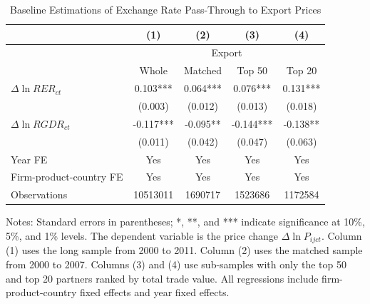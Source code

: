 \documentclass[12pt]{article}
\begin{document}
\begin{table}[htbp]
	\centering
	\caption{Baseline Estimations of Exchange Rate Pass-Through to Export Prices}
	\begin{threeparttable}
		\begin{tabular}{lcccc}
			\toprule
			& (1)   & (2)   & (3)   & (4) \\
			\midrule
			& \multicolumn{4}{c}{Export} \\
			& Whole & Matched & Top 50 & Top 20 \\
			\midrule
			$\Delta \ln RER_{ct}$ & 0.103*** & 0.064*** & 0.076*** & 0.131*** \\
			& (0.003) & (0.012) & (0.013) & (0.018) \\
			$\Delta \ln RGDR_{ct}$ &  -0.117*** & -0.095** & -0.144*** & -0.138** \\
			& (0.011) & (0.042) & (0.047) & (0.063) \\
			Year FE  & Yes   & Yes   & Yes   & Yes \\
			Firm-product-country FE & Yes   & Yes   & Yes   & Yes \\
			Observations & 10513011 & 1690717 & 1523686 & 1172584 \\
			\bottomrule
		\end{tabular}
		\begin{tablenotes}
			\footnotesize
			\item[Notes:] Standard errors in parentheses; *, **, and *** indicate significance at 10\%, 5\%, and 1\% levels. The dependent variable is the price change $\Delta \ln P_{ijct}$. Column (1) uses the long sample from 2000 to 2011. Column (2) uses the matched sample from 2000 to 2007. Columns (3) and (4) use sub-samples with only the top 50 and top 20 partners ranked by total trade value. All regressions include firm-product-country fixed effects and year fixed effects. 
		\end{tablenotes}
	\end{threeparttable}
	\label{tab.baseline.exp}
\end{table}
\end{document}
